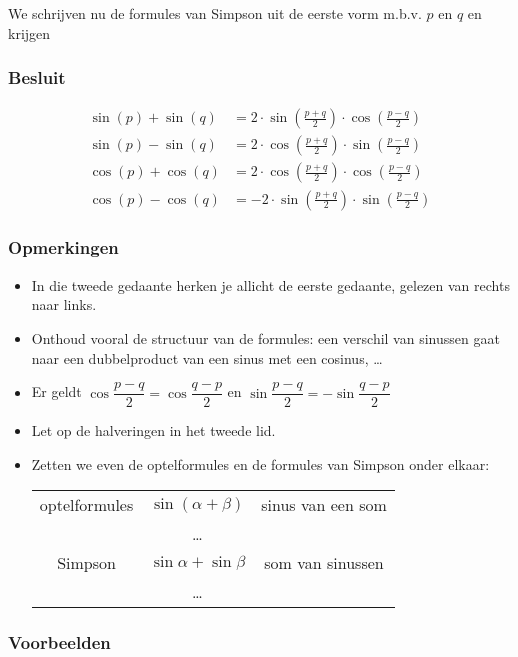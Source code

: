 \documentclass[twoside,a4paper,12pt]{article}
\begin{document}
We schrijven nu de formules van Simpson uit de eerste vorm m.b.v. $p$ en $q$ en krijgen

\subsubsection*{Besluit}
\begin{align*}
  \sin(p)+\sin(q) &= 2\cdot \sin(\frac{p+q}{2})\cdot \cos(\frac{p-q}{2})\\
  \sin(p)-\sin(q) &= 2\cdot \cos(\frac{p+q}{2})\cdot \sin(\frac{p-q}{2})\\
  \cos(p)+\cos(q) &= 2\cdot \cos(\frac{p+q}{2})\cdot \cos(\frac{p-q}{2})\\
  \cos(p)-\cos(q) &= -2\cdot \sin(\frac{p+q}{2})\cdot \sin(\frac{p-q}{2})
\end{align*}

\subsubsection*{Opmerkingen}
\begin{itemize}
  \item In die tweede gedaante herken je allicht de eerste gedaante, gelezen van rechts
naar links.
  \item Onthoud vooral de structuur van de formules: een verschil van sinussen gaat
naar een dubbelproduct van een sinus met een cosinus, \ldots
  \item Er geldt $\cos\dfrac{p-q}{2}=\cos\dfrac{q-p}{2}$ en $\sin\dfrac{p-q}{2}=-\sin\dfrac{q-p}{2}$
  \item Let op de halveringen in het tweede lid.
  \item Zetten we even de optelformules en de formules van Simpson onder elkaar:\\
\begin{tabular}{c|c|c}
optelformules & $\sin(\alpha + \beta)$ & sinus van een som\\
              & \ldots\\
Simpson & $\sin\alpha + \sin\beta$ & som van sinussen\\
              & \ldots\\
\end{tabular}
\end{itemize}

\subsubsection*{Voorbeelden}
\end{document}
